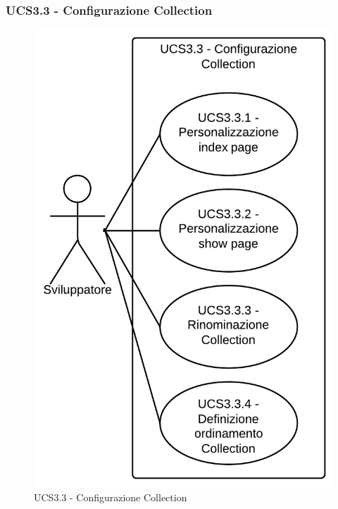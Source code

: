 \subsubsection{UCS3.3 - Configurazione Collection} 
    \begin{figure}[H]
      \begin{center}
      \includegraphics[scale=0.16]{UML/UCS3.3 - Configurazione Collection.png}
      \caption{UCS3.3 - Configurazione Collection}
      \end{center} 
    \end{figure}  
    
